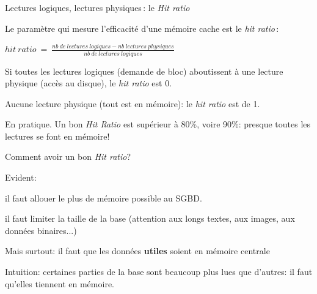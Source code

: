 \begin{frame}{Lectures logiques, lectures physiques\,: le \textit{Hit ratio}}

Le paramètre
qui mesure l'efficacité d'une mémoire cache
est le \textit{hit ratio}\,:
\begin{center}
   $hit\ ratio\ =\ \frac{nb\ de\ lectures\ logiques - nb\ lectures\ physiques}
         {nb\ de\ lectures\ logiques}$
\end{center}
\begin{redbullet}
 \item Si toutes les lectures logiques (demande de bloc) aboutissent
à une lecture physique (accès au disque), le \textit{hit
ratio} est 0.

\item Aucune lecture physique (tout est en mémoire):
le \textit{hit ratio} est de 1.
\end{redbullet}

\vfill
\begin{blocgauche}
\alert{En pratique}. Un bon \textit{Hit Ratio} est supérieur à 80\%, voire 90\%:
presque toutes les lectures se font en mémoire!
\end{blocgauche}

\end{frame}

\begin{frame}{Comment avoir un bon \textit{Hit ratio}?}


Evident: 

\vfill

\begin{redbullet}
  \item il faut allouer le plus de mémoire possible au SGBD.
  \item il faut limiter la taille de la base (attention aux longs textes, aux images, aux données binaires...)
\end{redbullet}

\vfill

\begin{blocgauche}

\alert{Mais surtout: il faut que les données \textbf{utiles} soient
en mémoire centrale}

\medskip

Intuition: certaines parties de la base sont \alert{beaucoup} plus lues
que d'autres: il faut qu'elles tiennent en mémoire.
\end{blocgauche}

\end{frame}


